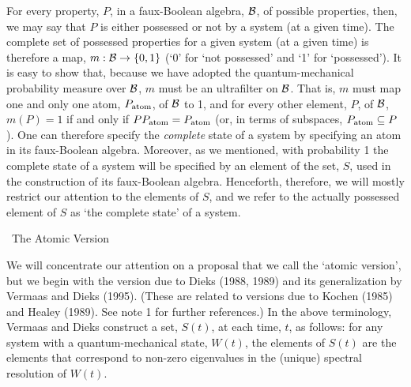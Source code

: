 \documentclass[12pt]{article}
\renewcommand{\subsection}[1]{\addtocounter{subsection}{1}
                           \setcounter{subsubsection}{0}
                           \vspace{20pt}
                           \begin{center}
                           \thesubsection \ #1
                           \end{center}
                           \vspace{20pt}}
\newcommand{\cB}{\cal{B}}                                       %
\begin{document}
For every property, $P$, in a faux-Boolean algebra, $\cB$, of possible 
properties, then, we may say that $P$ is either possessed or not by a 
system (at a given time).  The complete set of possessed properties 
for a given system (at a given time) is therefore a map, $m:{\cB} 
\rightarrow\{0,1\}$ (`0' for `not possessed' and `1' for `possessed').  
It is easy to show that, because we have adopted the 
quantum-mechanical probability measure over $\cB$, $m$ must be an 
ultrafilter on $\cB$.  That is, $m$ must map one and only one atom, 
$P_{\mbox{{\scriptsize atom}}}$, of $\cB$ to 1, and for every other 
element, $P$, of $\cB$, $m(P) = 1$ if and only if $P 
P_{\mbox{{\scriptsize atom}}} = P_{\mbox{{\scriptsize atom}}}$ (or, in 
terms of subspaces, $P_{\mbox{{\scriptsize atom}}} \subseteq P$).  One 
can therefore specify the {\it complete} state of a system by 
specifying an atom in its faux-Boolean algebra.  Moreover, as we 
mentioned, with probability 1 the complete state of a system will be 
specified by an element of the set, $S$, used in the construction of 
its faux-Boolean algebra.  Henceforth, therefore, we will mostly 
restrict our attention to the elements of $S$, and we refer to the 
actually possessed element of $S$ as `the complete state' of a system.


\subsection{The Atomic Version}


We will concentrate our attention on a proposal that we
call the `atomic version', but we begin with the version due to Dieks
(1988, 1989) and its generalization by Vermaas and Dieks (1995).
(These are related to versions due to Kochen (1985) and Healey (1989).
See note 1 for further references.) In the above terminology, Vermaas and
Dieks construct a set, $S(t)$, at each
time, $t$, as follows: for any system with a quantum-mechanical state,
$W(t)$, the elements of $S(t)$ are the elements that correspond to non-zero
eigenvalues in the (unique) spectral resolution of $W(t)$.
\end{document}
